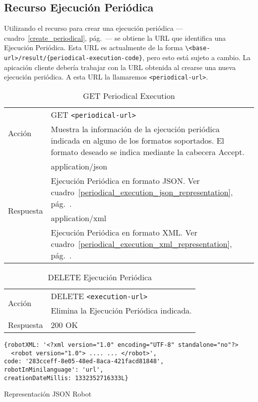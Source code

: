 \subsection{Recurso Ejecución Periódica}

Utilizando el recurso para crear una ejecución periódica
---cuadro~\ref{create_periodical}, pág.~\pageref{create_periodical}---
se obtiene la URL que identifica una Ejecución Periódica. Esta URL es
actualmente de la forma
\verb+\<base-url>/result/{periodical-execution-code}+, pero esto está
sujeto a cambio. La apicación cliente debería trabajar con la URL
obtenida al crearse una nueva ejecución periódica. A esta URL la
llamaremos \verb+<periodical-url>+.

\begin{table}
\begin{tabularx}{\textwidth}{l X}
\multirow{2}{*}{Acción}
 & GET \verb+<periodical-url>+ \\
 & Muestra la información de la ejecución periódica indicada en alguno de los
formatos soportados. El formato deseado se indica mediante la cabecera Accept.\\ \hline
\multirow{4}{*}{Respuesta}
& application/json \\
& Ejecución Periódica en formato JSON. Ver
cuadro~\ref{periodical_execution_json_representation}, pág.~\pageref{periodical_execution_json_representation}.\\ \cline{2-2}
& application/xml \\
& Ejecución Periódica en formato XML. Ver
cuadro~\ref{periodical_execution_xml_representation}, pág.~\pageref{periodical_execution_xml_representation}. \\
\end{tabularx}
\caption{GET Periodical Execution}
\label{get_periodical_execution}
\end{table}

\begin{table}
\begin{tabularx}{\textwidth}{l X}
\multirow{2}{*}{Acción}
 & DELETE \verb+<execution-url>+\\
& Elimina la Ejecución Periódica indicada.\\ \hline
\multirow{1}{*}{Respuesta}
 & 200 OK \\
\end{tabularx}
\caption{DELETE Ejecución Periódica}
\label{delete_periodical_execution}
\end{table}

\begin{table}
\begin{verbatim}
{robotXML: '<?xml version="1.0" encoding="UTF-8" standalone="no"?>
  <robot version="1.0"> .... ... </robot>',
code: '283cceff-8e05-48ed-8aca-421facd81848',
robotInMinilanguage': 'url',
creationDateMillis: 1332352716333L}
\end{verbatim}
\caption{Representación JSON Robot}
\label{robot_json_representation}
\end{table}

